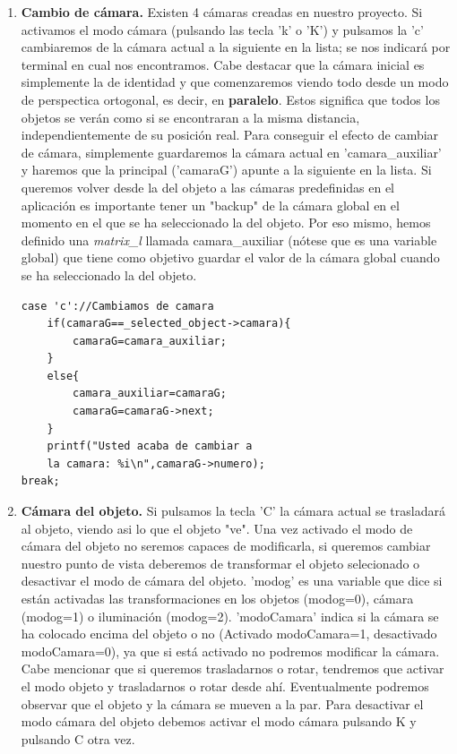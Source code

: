 \documentclass[12pt,a4paper]{article}
\begin{document}
\begin{enumerate}
\begin{enumerate}
\item \textbf{Cambio de cámara.}
Existen 4 cámaras creadas en nuestro proyecto. Si activamos el modo cámara (pulsando las tecla 'k' o 'K') y pulsamos la 'c' cambiaremos de la cámara actual a la siguiente en la lista; se nos indicará por terminal en cual nos encontramos.\newline
Cabe destacar que la cámara inicial es simplemente la de identidad y que comenzaremos viendo todo desde un modo de perspectica ortogonal, es decir, en \textbf{paralelo}. Estos significa que todos los objetos se verán como si se encontraran a la misma distancia, independientemente de su posición real.\newline
Para conseguir el efecto de cambiar de cámara, simplemente guardaremos la cámara actual en 'camara\_auxiliar' y haremos que la principal ('camaraG') apunte a la siguiente en la lista.
Si queremos volver desde la del objeto a las cámaras predefinidas en el aplicación es importante tener un "backup" de la cámara global en el momento en el que se ha seleccionado la del objeto. Por eso mismo, hemos definido una \textit{matrix\_l} llamada camara\_auxiliar (nótese que es una variable global) que tiene como objetivo guardar el valor de la cámara global cuando se ha seleccionado la del objeto.
\begin{lstlisting}
case 'c'://Cambiamos de camara
	if(camaraG==_selected_object->camara){
		camaraG=camara_auxiliar;
	}     
	else{
		camara_auxiliar=camaraG;
		camaraG=camaraG->next;
	}
    printf("Usted acaba de cambiar a 
    la camara: %i\n",camaraG->numero);
break;
\end{lstlisting}


\item \textbf{Cámara del objeto.}
Si pulsamos la tecla 'C' la cámara actual se trasladará al objeto, viendo asi lo que el objeto "ve". Una vez activado el modo de cámara del objeto no seremos capaces de modificarla, si queremos cambiar nuestro punto de vista deberemos de transformar el objeto selecionado o desactivar el modo de cámara del objeto.\newline
'modog' es una variable que dice si están activadas las transformaciones en los objetos (modog=0), cámara (modog=1) o iluminación (modog=2). 'modoCamara' indica si la cámara se ha colocado encima del objeto o no (Activado modoCamara=1, desactivado modoCamara=0), ya que si está activado no podremos modificar la cámara.\newline
Cabe mencionar que si queremos trasladarnos o rotar, tendremos que activar el modo objeto y trasladarnos o rotar desde ahí.
Eventualmente podremos observar que el objeto y la cámara se mueven a la par. Para desactivar el modo cámara del objeto debemos activar el modo cámara pulsando K y pulsando C otra vez.


\end{enumerate}
\end{enumerate}
\end{document}
